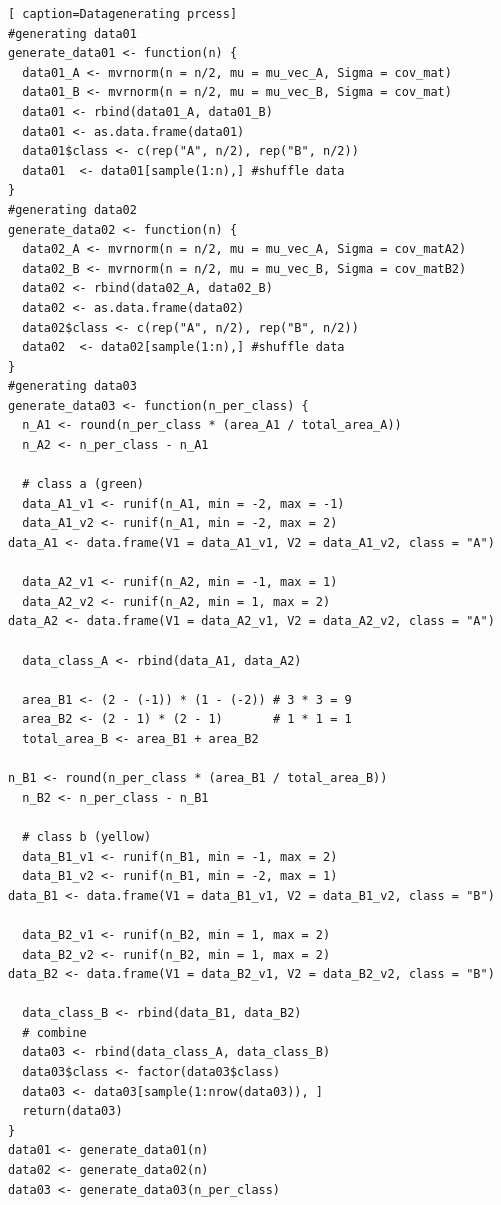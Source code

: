 \documentclass[12pt,a4paper,titlepage]{article}
\numberwithin{equation}{section}
\numberwithin{table}{section}
\numberwithin{figure}{section}
\begin{document}
        \begin{lstlisting}[ caption=Datagenerating prcess]
#generating data01
generate_data01 <- function(n) {
  data01_A <- mvrnorm(n = n/2, mu = mu_vec_A, Sigma = cov_mat)
  data01_B <- mvrnorm(n = n/2, mu = mu_vec_B, Sigma = cov_mat)
  data01 <- rbind(data01_A, data01_B)
  data01 <- as.data.frame(data01)
  data01$class <- c(rep("A", n/2), rep("B", n/2))
  data01  <- data01[sample(1:n),] #shuffle data
}
#generating data02
generate_data02 <- function(n) {
  data02_A <- mvrnorm(n = n/2, mu = mu_vec_A, Sigma = cov_matA2)
  data02_B <- mvrnorm(n = n/2, mu = mu_vec_B, Sigma = cov_matB2)
  data02 <- rbind(data02_A, data02_B)
  data02 <- as.data.frame(data02)
  data02$class <- c(rep("A", n/2), rep("B", n/2))
  data02  <- data02[sample(1:n),] #shuffle data
}
#generating data03
generate_data03 <- function(n_per_class) {
  n_A1 <- round(n_per_class * (area_A1 / total_area_A))
  n_A2 <- n_per_class - n_A1
  
  # class a (green)
  data_A1_v1 <- runif(n_A1, min = -2, max = -1)
  data_A1_v2 <- runif(n_A1, min = -2, max = 2)
data_A1 <- data.frame(V1 = data_A1_v1, V2 = data_A1_v2, class = "A")
  
  data_A2_v1 <- runif(n_A2, min = -1, max = 1)
  data_A2_v2 <- runif(n_A2, min = 1, max = 2)
data_A2 <- data.frame(V1 = data_A2_v1, V2 = data_A2_v2, class = "A")
  
  data_class_A <- rbind(data_A1, data_A2)
  
  area_B1 <- (2 - (-1)) * (1 - (-2)) # 3 * 3 = 9
  area_B2 <- (2 - 1) * (2 - 1)       # 1 * 1 = 1
  total_area_B <- area_B1 + area_B2
  
n_B1 <- round(n_per_class * (area_B1 / total_area_B))
  n_B2 <- n_per_class - n_B1
  
  # class b (yellow)
  data_B1_v1 <- runif(n_B1, min = -1, max = 2)
  data_B1_v2 <- runif(n_B1, min = -2, max = 1)
data_B1 <- data.frame(V1 = data_B1_v1, V2 = data_B1_v2, class = "B")
  
  data_B2_v1 <- runif(n_B2, min = 1, max = 2)
  data_B2_v2 <- runif(n_B2, min = 1, max = 2)
data_B2 <- data.frame(V1 = data_B2_v1, V2 = data_B2_v2, class = "B")
  
  data_class_B <- rbind(data_B1, data_B2)
  # combine
  data03 <- rbind(data_class_A, data_class_B)
  data03$class <- factor(data03$class)
  data03 <- data03[sample(1:nrow(data03)), ]
  return(data03)
}
data01 <- generate_data01(n)
data02 <- generate_data02(n)
data03 <- generate_data03(n_per_class)
           \end{lstlisting}     
        
\end{document}
